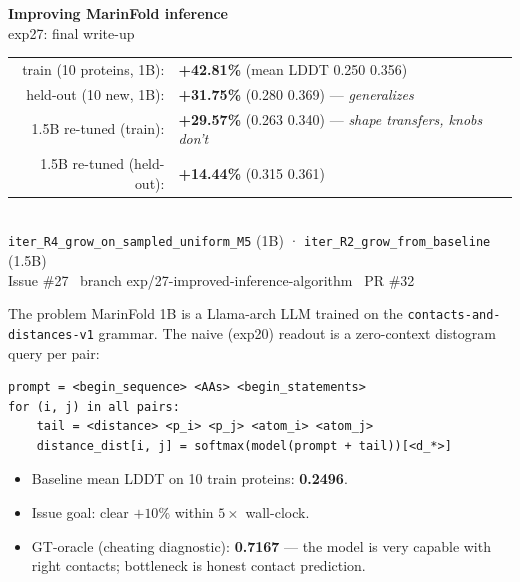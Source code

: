 \documentclass[aspectratio=169,11pt]{beamer}
\newcommand{\codeS}[1]{\texttt{\scriptsize\color{navy}#1}}
\begin{document}
\begin{frame}[plain]
  \begin{center}
    \vspace{0.4cm}
    {\Huge\bfseries\color{navy}Improving MarinFold inference}\\[0.3cm]
    {\Large\color{navy}exp27: final write-up}\\[1.0cm]
    \begin{tabular}{@{}rl@{}}
      \large train (10 proteins, 1B): & {\Large\color{green}\textbf{+42.81\%}} (mean LDDT 0.250 \textrightarrow{} 0.356)\\[0.4em]
      \large held-out (10 new, 1B):     & {\Large\color{green}\textbf{+31.75\%}} (0.280 \textrightarrow{} 0.369) — \emph{generalizes}\\[0.4em]
      \large 1.5B re-tuned (train):     & {\Large\color{green}\textbf{+29.57\%}} (0.263 \textrightarrow{} 0.340) — \emph{shape transfers, knobs don't}\\[0.4em]
      \large 1.5B re-tuned (held-out):  & {\Large\color{green}\textbf{+14.44\%}} (0.315 \textrightarrow{} 0.361)\\
    \end{tabular}
    \\[1.2cm]
    {\small\color{navy}\codeS{iter\_R4\_grow\_on\_sampled\_uniform\_M5} (1B) ·
      \codeS{iter\_R2\_grow\_from\_baseline} (1.5B)}\\[0.6cm]
    {\small\color{grey}\ttfamily Issue \#27 \textperiodcentered\
      branch exp/27-improved-inference-algorithm \textperiodcentered\
      PR \#32}
  \end{center}
\end{frame}

\begin{frame}[fragile]{The problem}
  MarinFold 1B is a Llama-arch LLM trained on the
  \codeS{contacts-and-distances-v1} grammar. The naive (exp20) readout
  is a zero-context distogram query per pair:
  \begin{lstlisting}[style=code]
prompt = <begin_sequence> <AAs> <begin_statements>
for (i, j) in all pairs:
    tail = <distance> <p_i> <p_j> <atom_i> <atom_j>
    distance_dist[i, j] = softmax(model(prompt + tail))[<d_*>]
  \end{lstlisting}
  \vspace{0.3em}
  \begin{itemize}
    \setlength\itemsep{0.3em}
    \item Baseline mean LDDT on 10 train proteins: \textbf{0.2496}.
    \item Issue goal: clear $+10\%$ within $5\times$ wall-clock.
    \item GT-oracle (cheating diagnostic): \textbf{0.7167} — the
          model is very capable with right contacts; bottleneck is
          honest contact prediction.
  \end{itemize}
\end{frame}
\end{document}

